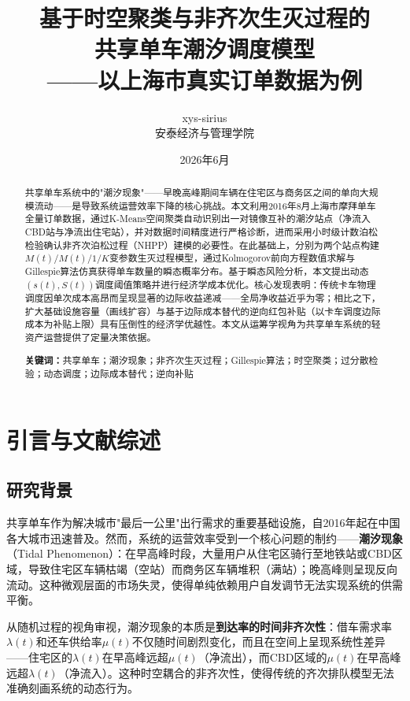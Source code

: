\documentclass[12pt,a4paper]{article}
\title{\textbf{基于时空聚类与非齐次生灭过程的\\共享单车潮汐调度模型\\——以上海市真实订单数据为例}}
\author{xys-sirius\\安泰经济与管理学院}
\date{2026年6月}
\begin{document}
\maketitle

\begin{abstract}
共享单车系统中的"潮汐现象"——早晚高峰期间车辆在住宅区与商务区之间的单向大规模流动——是导致系统运营效率下降的核心挑战。本文利用2016年8月上海市摩拜单车全量订单数据，通过K-Means空间聚类自动识别出一对镜像互补的潮汐站点（净流入CBD站与净流出住宅站），并对数据时间精度进行严格诊断，进而采用小时级计数泊松检验确认非齐次泊松过程（NHPP）建模的必要性。在此基础上，分别为两个站点构建$M(t)/M(t)/1/K$变参数生灭过程模型，通过Kolmogorov前向方程数值求解与Gillespie算法仿真获得单车数量的瞬态概率分布。基于瞬态风险分析，本文提出动态$(s(t),S(t))$调度阈值策略并进行经济学成本优化。核心发现表明：传统卡车物理调度因单次成本高昂而呈现显著的边际收益递减——全局净收益近乎为零；相比之下，扩大基础设施容量（画线扩容）与基于边际成本替代的逆向红包补贴（以卡车调度边际成本为补贴上限）具有压倒性的经济学优越性。本文从运筹学视角为共享单车系统的轻资产运营提供了定量决策依据。

\textbf{关键词：}共享单车；潮汐现象；非齐次生灭过程；Gillespie算法；时空聚类；过分散检验；动态调度；边际成本替代；逆向补贴
\end{abstract}

\section{引言与文献综述}

\subsection{研究背景}

共享单车作为解决城市"最后一公里"出行需求的重要基础设施，自2016年起在中国各大城市迅速普及。然而，系统的运营效率受到一个核心问题的制约——\textbf{潮汐现象}（Tidal Phenomenon）：在早高峰时段，大量用户从住宅区骑行至地铁站或CBD区域，导致住宅区车辆枯竭（空站）而商务区车辆堆积（满站）；晚高峰则呈现反向流动。这种微观层面的市场失灵，使得单纯依赖用户自发调节无法实现系统的供需平衡。

从随机过程的视角审视，潮汐现象的本质是\textbf{到达率的时间非齐次性}：借车需求率$\lambda(t)$和还车供给率$\mu(t)$不仅随时间剧烈变化，而且在空间上呈现系统性差异——住宅区的$\lambda(t)$在早高峰远超$\mu(t)$（净流出），而CBD区域的$\mu(t)$在早高峰远超$\lambda(t)$（净流入）。这种时空耦合的非齐次性，使得传统的齐次排队模型无法准确刻画系统的动态行为。
\end{document}
